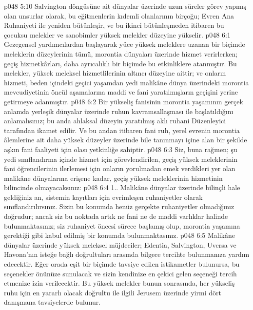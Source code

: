\vs p048 5:10 Salvington döngüsüne ait dünyalar üzerinde uzun süreler görev yapmış olan unsurlar olarak, bu eğitmenlerin kıdemli olanlarının birçoğu; Evren Ana Ruhaniyeti ile yeniden bütünleşir, ve bu ikinci bütünleşmeden itibaren bu çocuksu melekler ve sanobimler yüksek melekler düzeyine yükselir.
\vs p048 6:1 Gezegensel yardımcılardan başlayarak yüce yüksek meleklere uzanan bir biçimde meleklerin düzeylerinin tümü, morontia dünyaları üzerinde hizmet verirlerken; geçiş hizmetkârları, daha ayrıcalıklı bir biçimde bu etkinliklere atanmıştır. Bu melekler, yüksek meleksel hizmetlilerinin altıncı düzeyine aittir; ve onların hizmeti, beden içindeki geçici yaşamdan yedi malikâne dünya üzerindeki morontia mevcudiyetinin öncül aşamalarına maddi ve fani yaratılmışların geçişini yerine getirmeye adanmıştır.
\vs p048 6:2 Bir yükseliş fanisinin morontia yaşamının gerçek anlamda yerleşik dünyalar üzerinde ruhun kavramsallaşması ile başlatıldığını anlamalısınız; bu anda ahlaksal düzeyin yaratılmış aklı ruhani Düzenleyici tarafından ikamet edilir. Ve bu andan itibaren fani ruh, yerel evrenin morontia âlemlerine ait daha yüksek düzeyler üzerinde bile tanınmayı içine alan bir şekilde aşkın fani faaliyeti için olası yetkinliğe sahiptir.
\vs p048 6:3 Siz, buna rağmen; şu yedi sınıflandırma içinde hizmet için görevlendirilen, geçiş yüksek meleklerinin fani öğrencilerinin ilerlemesi için onların yorulmadan emek verdikleri yer olan malikâne dünyalarına erişene kadar, geçiş yüksek meleklerinin hizmetinin bilincinde olmayacaksınız:
\vs p048 6:4 1.\bibnobreakspace {}. Malikâne dünyalar üzerinde bilinçli hale geldiğiniz an, sistemin kayıtları için evrimleşen ruhaniyetler olarak sınıflandırılırsınız. Sizin bu konumda henüz gerçekte ruhaniyetler olmadığınız doğrudur; ancak siz bu noktada artık ne fani ne de maddi varlıklar halinde bulunmaktasınız; siz ruhaniyet öncesi sürece başlamış olup, morontia yaşamına gerektiği gibi kabul edilmiş bir konumda bulunmaktasınız.
\vs p048 6:5 Malikâne dünyalar üzerinde yüksek meleksel müjdeciler; Edentia, Salvington, Uversa ve Havona’nın isteğe bağlı doğrultuları arasında bilgece tercihte bulunmanıza yardım edecektir. Eğer orada eşit bir biçimde tavsiye edilen istikametler bulunursa, bu seçenekler önünüze sunulacak ve sizin kendinize en çekici gelen seçeneği tercih etmenize izin verilecektir. Bu yüksek melekler bunun sonrasında, her yükseliş ruhu için en yararlı olacak doğrultu ile ilgili Jerusem üzerinde yirmi dört danışmana tavsiyelerde bulunur.
